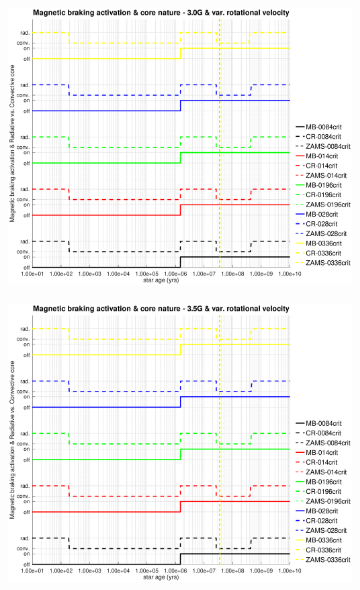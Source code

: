 \documentclass[fleqn,usenatbib]{mnras}
\begin{document}
{{\begin{figure}
    \centering
    \begin{subfigure}[h]{0.47\textwidth}
    \includegraphics[trim = 30mm 15mm 20mm 15mm, clip,width=\textwidth]{figures/mb_act_var_vel_3_0g.eps}
    \label{fig:subim31}
    \end{subfigure}
    \begin{subfigure}[h]{0.47\textwidth}
    \includegraphics[trim = 30mm 15mm 20mm 15mm, clip,width=\textwidth]{figures/mb_act_var_vel_3_5g.eps}
    \label{fig:subim32}
    \end{subfigure}

\end{figure}}}
\end{document}
